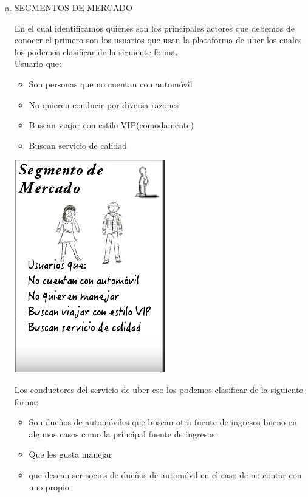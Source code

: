 \documentclass[10pt,a4paper]{article}
\begin{document}
\begin{multicols}{2}
\begin{enumerate}[a.]
			\item SEGMENTOS DE MERCADO 
			
			En el cual identificamos quiénes son los principales actores que debemos de conocer el primero son los usuarios que usan la plataforma de uber los cuales los podemos clasificar de la siguiente forma.\\
			
			Usuario que:
			\begin{itemize}
				\item Son personas que no cuentan con automóvil
				\item No quieren conducir por diversa razones
				\item Buscan viajar con estilo VIP(comodamente)
				\item Buscan servicio de calidad
			\end{itemize}
		
			\begin{center}
				\includegraphics[scale=0.55]{./Imagenes/img05}
			\end{center}
				
			Los conductores del servicio de uber eso los podemos clasificar de la
			siguiente forma:
			\begin{itemize}
				\item Son dueños de automóviles que buscan otra fuente de ingresos bueno en algunos casos como la principal fuente de ingresos. 
				\item Que les gusta manejar 
				\item que desean ser socios de dueños de automóvil en el caso de no contar con uno propio
			\end{itemize}
		

\end{enumerate}
\end{multicols}
\end{document}
